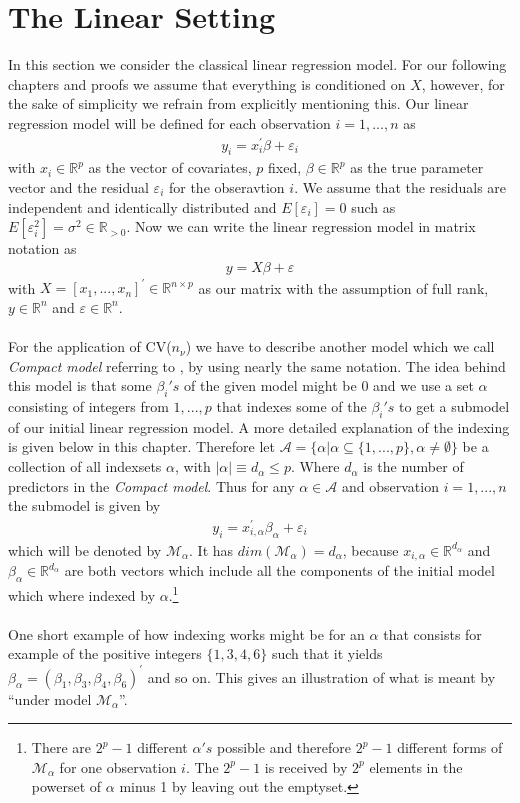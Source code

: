 \documentclass[Research_Module_ES.tex]{subfiles}
\begin{document}
\section{The Linear Setting}
In this section we consider the classical linear regression model. For our following chapters and proofs we assume that everything is conditioned on $X$, however, for the sake of simplicity we refrain from explicitly mentioning this. Our linear regression model will be defined for each observation $i=1,...,n$ as
\begin{align*}
y_i=x_i^\prime\beta+\varepsilon_i
\end{align*}
with $x_i\in\mathbb{R}^p$ as the vector of covariates, $p$ fixed, $\beta\in\mathbb{R}^p$ as the true parameter vector and the residual $\varepsilon_i$ for the obseravtion $i$.
We assume that the residuals are independent and identically distributed and $E[\varepsilon_i]=0$ such as $E[\varepsilon_i^2]=\sigma^2\in\mathbb{R}_{>0}$. Now we can write the linear regression model in matrix notation as
\begin{align*}
	y=X\beta+\varepsilon
\end{align*}
with $X=[x_1,...,x_n]^\prime\in\mathbb{R}^{n\times p}$ as our matrix with the assumption of full rank, $y\in\mathbb{R}^{n}$ and $\varepsilon\in\mathbb{R}^{n}$.
\\\\
For the application of CV($n_\nu$) we have to describe another model which we call \textit{Compact model} referring to \cite{shao}, by using nearly the same notation. The idea behind this model is that some $\beta_i's$ of the given model might be $0$ and we use a set $\alpha$ consisting of integers from $1,...,p$ that indexes some of the $\beta_i's$ to get a submodel of our initial linear regression model. A more detailed explanation of the indexing is given below in this chapter. Therefore let 
$\mathcal{A}=\{\alpha|\alpha\subseteq\{1,...,p\},\alpha\neq\emptyset\}$ be a collection of all indexsets $\alpha$, with 
$|\alpha|\equiv d_\alpha\leq p$. Where $d_\alpha$ is the number of predictors in the \textit{Compact model}. Thus for any $\alpha\in\mathcal{A}$ and observation $i=1,...,n$ the submodel is given by
\begin{align*}
	y_i=x_{i,\alpha}^\prime\beta_\alpha+\varepsilon_i
\end{align*}
which will be denoted by $\mathcal{M}_\alpha$. It has  $dim(\mathcal{M}_\alpha)=d_\alpha$, because $x_{i,\alpha}\in\mathbb{R}^{d_\alpha}$ and $\beta_\alpha\in\mathbb{R}^{d_\alpha}$ are both vectors which include all the components of the initial model which where indexed by $\alpha$.\footnote{There are $2^p-1$ different $\alpha's$ possible and therefore $2^p-1$ different forms of $\mathcal{M}_\alpha$ for one observation $i$. The $2^p-1$ is received by $2^p$ elements in the powerset of $\alpha$ minus 1 by leaving out the emptyset.}\\\\
One short example of how indexing works might be for an $\alpha$ that consists for example of the positive integers $\{1,3,4,6\}$ such that it yields $\beta_\alpha=(\beta_1,\beta_3,\beta_4,\beta_6)^\prime$ and so on. This gives an illustration of what is meant by ``under model $\mathcal{M}_\alpha$''.
\end{document}

